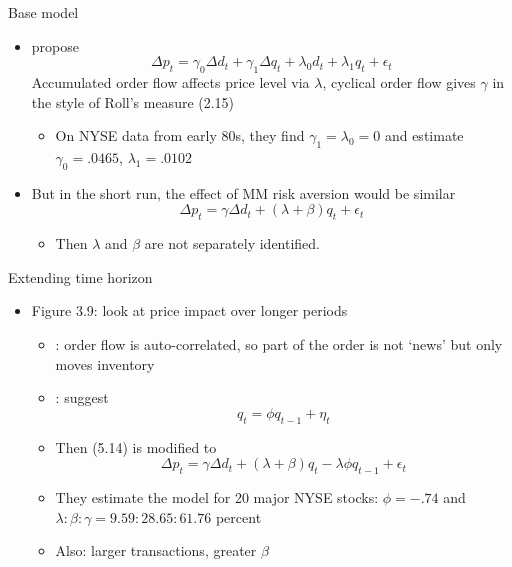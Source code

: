 \documentclass[english,10pt]{beamer}
\begin{document}
\begin{frame}[label=base]{Base model}
	\begin{itemize}
		\item \cite{glosten_estimating_1988} propose
		\begin{equation} \tag{5.7}
		\Delta p_t = \gamma_0 \Delta d_t+ \gamma_1 \Delta q_t + \lambda_0 d_t + \lambda_1 q_t + \epsilon_t%
		\end{equation}%
		Accumulated order flow affects price level via $\lambda$, cyclical order flow gives $\gamma$ in the style of Roll's measure (2.15)
		\begin{itemize}
			\item On NYSE data from early 80s, they find $\gamma_1=\lambda_0=0$ and estimate $\gamma_0=.0465$, $\lambda_1=.0102$
		\end{itemize}
		\item But in the short run, the effect of MM risk aversion would be similar
		\begin{equation} \tag{5.14}
		\Delta p_t = \gamma \Delta d_t + (\lambda + \beta) q_t + \epsilon_t
		\end{equation}
		\begin{itemize}
			\item Then $\lambda$ and $\beta$ are not separately identified. \hyperlink{example2}{}
		\end{itemize}
	\end{itemize}
\end{frame}


\begin{frame}[label=extending]{Extending time horizon}
	\begin{itemize}
		\item Figure 3.9: look at price impact over longer periods
		\begin{itemize}
			\item \textbf{\cite{hasbrouck_trades_1988}}: order flow is auto-correlated, so part of the order is not `news' but only moves inventory
			\item \textbf{\cite{huang_components_1997}}: suggest
			\begin{equation}\tag{5.17}
			q_t = \phi q_{t-1} + \eta_t
			\end{equation}
			\item Then (5.14) is modified to \hyperlink{derivation}{}
			\begin{equation} \tag{5.21}
			\Delta p_t = \gamma \Delta d_t + (\lambda+\beta)q_t - \lambda \phi q_{t-1} + \epsilon_t
			\end{equation}
			\item They estimate the model for 20 major NYSE stocks: $\phi = -.74$ and $ \lambda : \beta :\gamma = 9.59 : 28.65 : 61.76$ percent
			\item Also: larger transactions, greater $\beta$  \hyperlink{example3}{}
		\end{itemize}
	\end{itemize}
\end{frame}
\end{document}
